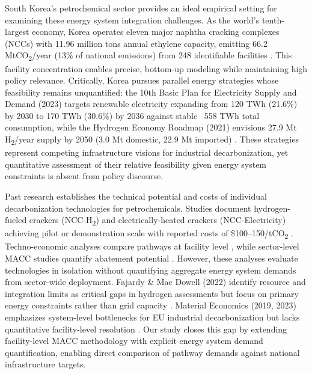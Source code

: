 \documentclass[11pt,a4paper]{article}
\begin{document}
South Korea's petrochemical sector provides an ideal empirical setting for examining these energy system integration challenges. As the world's tenth-largest economy, Korea operates eleven major naphtha cracking complexes (NCCs) with 11.96 million tons annual ethylene capacity, emitting 66.2 MtCO\textsubscript{2}/year (13\% of national emissions) from 248 identifiable facilities \citep{InvestKorea2023,KPIA2023,GESI2024}. This facility concentration enables precise, bottom-up modeling while maintaining high policy relevance. Critically, Korea pursues parallel energy strategies whose feasibility remains unquantified: the 10th Basic Plan for Electricity Supply and Demand (2023) targets renewable electricity expanding from 120 TWh (21.6\%) by 2030 to 170 TWh (30.6\%) by 2036 against stable ~558 TWh total consumption, while the Hydrogen Economy Roadmap (2021) envisions 27.9 Mt H\textsubscript{2}/year supply by 2050 (3.0 Mt domestic, 22.9 Mt imported) \citep{Kim2023}. These strategies represent competing infrastructure visions for industrial decarbonization, yet quantitative assessment of their relative feasibility given energy system constraints is absent from policy discourse.

Past research establishes the technical potential and costs of individual decarbonization technologies for petrochemicals. Studies document hydrogen-fueled crackers (NCC-H\textsubscript{2}) and electrically-heated crackers (NCC-Electricity) achieving pilot or demonstration scale with reported costs of \$100--150/tCO\textsubscript{2} \citep{Wattanasoponvanij2025,Leicher2023}. Techno-economic analyses compare pathways at facility level \citep{Gupta2023,Chen2024}, while sector-level MACC studies quantify abatement potential \citep{Cederschiold2020,Chen2019}. However, these analyses evaluate technologies in isolation without quantifying aggregate energy system demands from sector-wide deployment. Fajardy \& Mac Dowell (2022) identify resource and integration limits as critical gaps in hydrogen assessments but focus on primary energy constraints rather than grid capacity \citep{Fajardy2022}. Material Economics (2019, 2023) emphasizes system-level bottlenecks for EU industrial decarbonization but lacks quantitative facility-level resolution \citep{MaterialEconomics2019,MaterialEconomics2023}. Our study closes this gap by extending facility-level MACC methodology with explicit energy system demand quantification, enabling direct comparison of pathway demands against national infrastructure targets.
\end{document}
